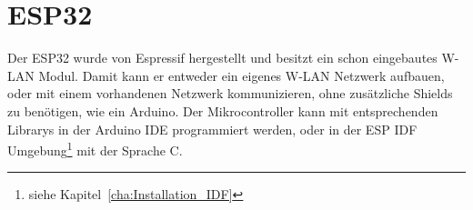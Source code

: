 \section{ESP32}
Der ESP32 wurde von Espressif hergestellt und besitzt ein schon eingebautes W-LAN Modul. Damit kann er entweder ein eigenes W-LAN Netzwerk aufbauen, oder mit einem vorhandenen Netzwerk kommunizieren, ohne zusätzliche Shields zu benötigen, wie ein Arduino. Der Mikrocontroller kann mit entsprechenden Librarys in der Arduino IDE programmiert werden, oder in der ESP IDF Umgebung\footnote{siehe Kapitel~\ref{cha:Installation_IDF}} mit der Sprache C.
